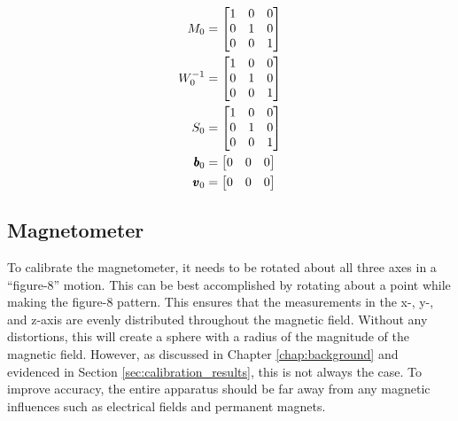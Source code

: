 \begin{gather}
    \begin{aligned}
        M_0 &= 
        \begin{bmatrix}
        1 & 0 & 0 \\
        0 & 1 & 0 \\
        0 & 0 & 1 \\    
        \end{bmatrix} \\
        W^{-1}_0 &= 
        \begin{bmatrix}
            1 & 0 & 0 \\
            0 & 1 & 0 \\
            0 & 0 & 1 \\    
        \end{bmatrix} \\
        S_0 &= 
        \begin{bmatrix}
            1 & 0 & 0 \\
            0 & 1 & 0 \\
            0 & 0 & 1 \\
        \end{bmatrix} \\
        \pmb{b}_0 &= 
        \begin{bmatrix}
            0 & 0 & 0
        \end{bmatrix} \\
        \pmb{v}_0 &= 
        \begin{bmatrix}
            0 & 0 & 0
        \end{bmatrix}
    \end{aligned} \notag
\end{gather}

\subsection{Magnetometer} 
To calibrate the magnetometer, it needs to be rotated about all three axes in a ``figure-8'' motion.
This can be best accomplished by rotating about a point while making the figure-8 pattern.
This ensures that the measurements in the x-, y-, and z-axis are evenly distributed throughout the magnetic field.
Without any distortions, this will create a sphere with a radius of the magnitude of the magnetic field.
However, as discussed in Chapter \ref{chap:background} and evidenced in Section \ref{sec:calibration_results}, this is not always the case.
To improve accuracy, the entire apparatus should be far away from any magnetic influences such as electrical fields and permanent magnets.

